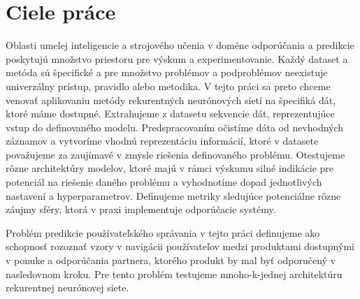 \chapter{Ciele práce}

Oblasti umelej inteligencie a strojového učenia v doméne odporúčania a predikcie poskytujú množstvo priestoru pre výskum a experimentovanie. Každý dataset a metóda sú špecifické a pre množstvo problémov a podproblémov neexistuje univerzálny prístup, pravidlo alebo metodika.\newline 
V tejto práci sa preto chceme venovať aplikovaniu metódy rekurentných neurónových sietí na špecifiká dát, ktoré máme dostupné. Extrahujeme z datasetu sekvencie dát, reprezentujúce vstup do definovaného modelu. Predspracovaním očistíme dáta od nevhodných záznamov a vytvoríme vhodnú reprezentáciu informácií, ktoré v datasete považujeme za zaujímavé v zmysle riešenia definovaného problému.\newline
Otestujeme rôzne architektúry modelov, ktoré majú v rámci výskumu silné indikácie pre potenciál na riešenie daného problému a vyhodnotíme dopad jednotlivých nastavení a hyperparametrov. Definujeme metriky sledujúce potenciálne rôzne záujmy sféry, ktorá v praxi implementuje odporúčacie systémy.

Problém predikcie používateľského správania v tejto práci definujeme ako schopnosť rozoznať vzory v navigácii používateľov medzi produktami dostupnými v ponuke a odporúčania partnera, ktorého produkt by mal byť odporučený v nasledovnom kroku. Pre tento problém testujeme mnoho-k-jednej architektúru rekurentnej neurónovej siete.
